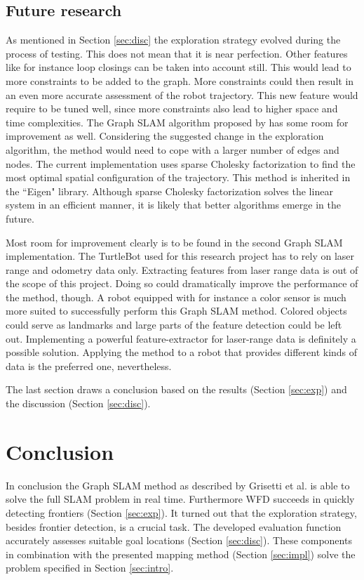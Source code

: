 \documentclass{ba-kecs}
\begin{document}
\subsection{Future research}
As mentioned in Section \ref{sec:disc} the exploration strategy evolved during the process of testing. This does not mean that it is near perfection. Other features like for instance loop closings can be taken into account still. This would lead to more constraints to be added to the graph. More constraints could then result in an even more accurate assessment of the robot trajectory. This new feature would require to be tuned well, since more constraints also lead to higher space and time complexities. 
The Graph SLAM algorithm proposed by \citep{Grisetti} has some room for improvement as well. Considering the suggested change in the exploration algorithm, the method would need to cope with a larger number of edges and nodes.
The current implementation uses sparse Cholesky factorization to find the most optimal spatial configuration of the trajectory. This method is inherited in the ``Eigen" library. Although sparse Cholesky factorization solves the linear system in an efficient manner, it is likely that better algorithms emerge in the future.

Most room for improvement clearly is to be found in the second Graph SLAM implementation. The TurtleBot used for this research project has to rely on laser range and odometry data only. Extracting features from laser range data is out of the scope of this project. Doing so could dramatically improve the performance of the method, though. 
A robot equipped with for instance a color sensor is much more suited to successfully perform this Graph SLAM method. Colored objects could serve as landmarks and large parts of the feature detection could be left out. Implementing a powerful feature-extractor for laser-range data is definitely a possible solution. Applying the method to a robot that provides different kinds of data is the preferred one, nevertheless.

The last section draws a conclusion based on the results (Section \ref{sec:exp}) and the discussion (Section \ref{sec:disc}).
\section{Conclusion}
\label{sec:conc}
In conclusion the Graph SLAM method as described by Grisetti et al. \citep{Grisetti} is able to solve the full SLAM problem in real time. Furthermore WFD succeeds in quickly detecting frontiers (Section \ref{sec:exp}). It turned out that the exploration strategy, besides frontier detection, is a crucial task. The developed evaluation function accurately assesses suitable goal locations (Section \ref{sec:disc}). These components in combination with the presented mapping method (Section \ref{sec:impl}) solve the problem specified in Section \ref{sec:intro}.


\nocite{*}
\onecolumn
\appendix
\end{document}
